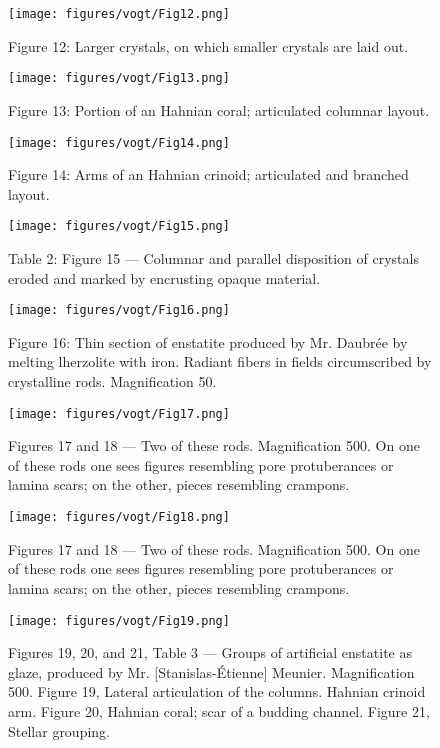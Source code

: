 \documentclass[a4paper, 12pt, oneside]{article}
\begin{document}
\clearpage
{}
\begin{figure}[b]
\centering
\texttt{[image: figures/vogt/Fig12.png]}
\caption{Figure 12: Larger crystals, on which smaller crystals are laid out.}
\end{figure}
\clearpage
\begin{figure}[b]
\centering
\texttt{[image: figures/vogt/Fig13.png]}
\caption{Figure 13: Portion of an Hahnian coral; articulated columnar layout.}
\end{figure}
\clearpage
\begin{figure}[b]
\centering
\texttt{[image: figures/vogt/Fig14.png]}
\caption{Figure 14: Arms of an Hahnian crinoid; articulated and branched layout.}
\end{figure}
\clearpage
\begin{figure}[b]
\centering
\texttt{[image: figures/vogt/Fig15.png]}
\caption{Table 2: Figure 15 --- Columnar and parallel disposition of crystals eroded and marked by encrusting opaque material.}
\end{figure}
\clearpage
{}
\begin{figure}[b]
\texttt{[image: figures/vogt/Fig16.png]}
\caption{Figure 16: Thin section of enstatite produced by Mr. Daubrée by melting lherzolite with iron. Radiant fibers in fields circumscribed by crystalline rods. Magnification 50.}
\centering
\end{figure}
\clearpage
\begin{figure}[b]
\centering
\texttt{[image: figures/vogt/Fig17.png]}
\caption{Figures 17 and 18 --- Two of these rods. Magnification 500. On one of these rods one sees figures resembling pore protuberances or lamina scars; on the other, pieces resembling crampons.}
\end{figure}
\begin{figure}[b]
\centering
\texttt{[image: figures/vogt/Fig18.png]}
\caption{Figures 17 and 18 --- Two of these rods. Magnification 500. On one of these rods one sees figures resembling pore protuberances or lamina scars; on the other, pieces resembling crampons.}
\end{figure}
\clearpage
\begin{figure}[b]
\centering
\texttt{[image: figures/vogt/Fig19.png]}
\caption{Figures 19, 20, and 21, Table 3 --- Groups of artificial enstatite as glaze, produced by Mr. [Stanislas-Étienne] Meunier. Magnification 500. Figure 19, Lateral articulation of the columns. Hahnian crinoid arm. Figure 20, Hahnian coral; scar of a budding channel. Figure 21, Stellar grouping.}
\end{figure}
\end{document}
